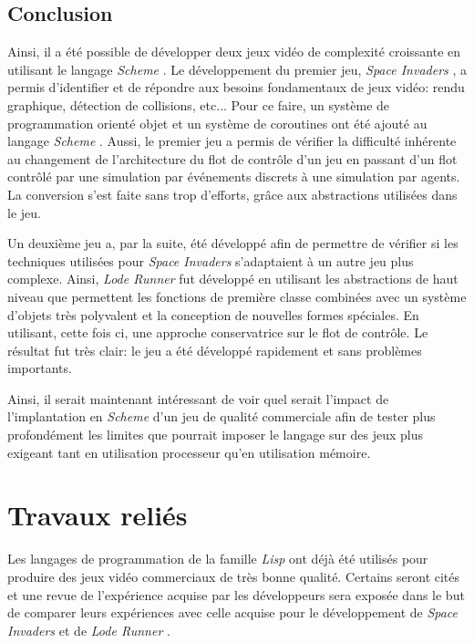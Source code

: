 \documentclass[12pt,twoside,letterpaper,francais]{book}
\newcommand{\lr}{{\textit{Lode Runner }}}
\newcommand{\si}{{\textit{Space Invaders }}}
\newcommand{\lisp}{{\textit{Lisp }}}
\newcommand{\Schemelang}{{\textit{Scheme }}}
\begin{document}
\FloatBarrier
\section{Conclusion}
Ainsi, il a été possible de développer deux jeux vidéo de complexité
croissante en utilisant le langage \Schemelang. Le développement du premier
jeu, \si, a permis d'identifier et de répondre aux besoins
fondamentaux de jeux vidéo: rendu graphique, détection de collisions,
etc... Pour ce faire, un système de programmation orienté objet et un
système de coroutines ont été ajouté au langage \Schemelang. Aussi, le
premier jeu a permis de vérifier la difficulté inhérente au changement
de l'architecture du flot de contrôle d'un jeu en passant d'un flot
contrôlé par une simulation par événements discrets à une simulation
par agents. La conversion s'est faite sans trop d'efforts, grâce aux
abstractions utilisées dans le jeu.

Un deuxième jeu a, par la suite, été développé afin de permettre de
vérifier si les techniques utilisées pour \si s'adaptaient à un autre
jeu plus complexe. Ainsi, \lr fut développé en utilisant les
abstractions de haut niveau que permettent les fonctions de première
classe combinées avec un système d'objets très polyvalent et la
conception de nouvelles formes spéciales. En utilisant, cette fois ci,
une approche conservatrice sur le flot de contrôle. Le résultat fut
très clair: le jeu a été développé rapidement et sans problèmes
importants.

Ainsi, il serait maintenant intéressant de voir quel serait l'impact
de l'implantation en \Schemelang d'un jeu de qualité commerciale afin de
tester plus profondément les limites que pourrait imposer le langage
sur des jeux plus exigeant tant en utilisation processeur qu'en
utilisation mémoire.





\clearpage

\chapter{Travaux reliés}
Les langages de programmation de la famille \lisp ont déjà été
utilisés pour produire des jeux vidéo commerciaux de très bonne
qualité. Certains seront cités et une revue de l'expérience acquise
par les développeurs sera exposée dans le but de comparer leurs
expériences avec celle acquise pour le développement de \si et de \lr.
\end{document}
